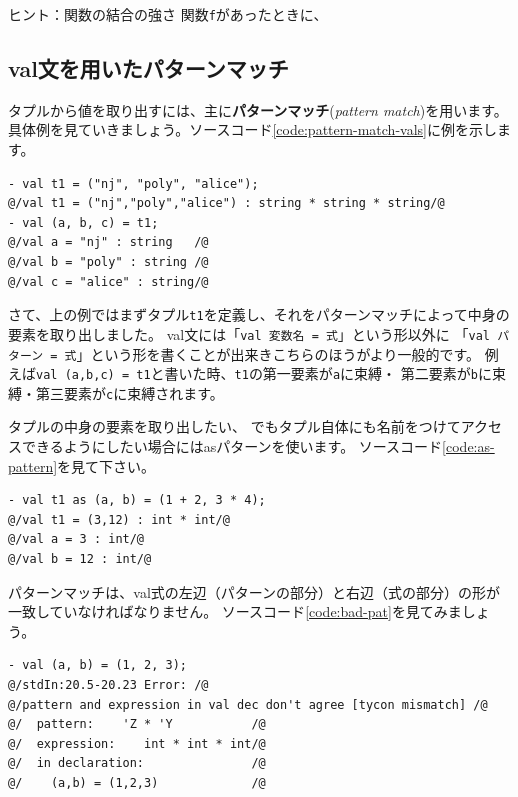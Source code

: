 \documentclass[11pt,a4paper]{article}
\begin{document}
\begin{itembox}[l]{ヒント：関数の結合の強さ}
関数\lstinline{f}があったときに、
\end{itembox}

\subsection{val文を用いたパターンマッチ}

タプルから値を取り出すには、主に{\bfseries パターンマッチ}({\itshape pattern match})を用います。
具体例を見ていきましょう。ソースコード\ref{code:pattern-match-vals}に例を示します。

\begin{lstlisting}[caption=val文でパターンマッチ,label=code:pattern-match-vals]
- val t1 = ("nj", "poly", "alice");
@/val t1 = ("nj","poly","alice") : string * string * string/@
- val (a, b, c) = t1;
@/val a = "nj" : string   /@
@/val b = "poly" : string /@
@/val c = "alice" : string/@
\end{lstlisting}

さて、上の例ではまずタプル\lstinline{t1}を定義し、それをパターンマッチによって中身の要素を取り出しました。
val文には「\lstinline{val 変数名 = 式}」という形以外に
「\lstinline{val パターン = 式}」という形を書くことが出来きこちらのほうがより一般的です。
例えば\lstinline{val (a,b,c) = t1}と書いた時、\lstinline{t1}の第一要素が\lstinline{a}に束縛・
第二要素が\lstinline{b}に束縛・第三要素が\lstinline{c}に束縛されます。

タプルの中身の要素を取り出したい、
でもタプル自体にも名前をつけてアクセスできるようにしたい場合にはasパターンを使います。
ソースコード\ref{code:as-pattern}を見て下さい。

\begin{lstlisting}[caption=asパターン,label=code:as-pattern]
- val t1 as (a, b) = (1 + 2, 3 * 4);
@/val t1 = (3,12) : int * int/@
@/val a = 3 : int/@
@/val b = 12 : int/@
\end{lstlisting}

パターンマッチは、val式の左辺（パターンの部分）と右辺（式の部分）の形が一致していなければなりません。
ソースコード\ref{code:bad-pat}を見てみましょう。
\begin{lstlisting}[caption=型が合わないパターンマッチ,label=code:bad-pat]
- val (a, b) = (1, 2, 3);
@/stdIn:20.5-20.23 Error: /@
@/pattern and expression in val dec don't agree [tycon mismatch] /@
@/  pattern:    'Z * 'Y           /@
@/  expression:    int * int * int/@
@/  in declaration:               /@
@/    (a,b) = (1,2,3)             /@
\end{lstlisting}
\end{document}

